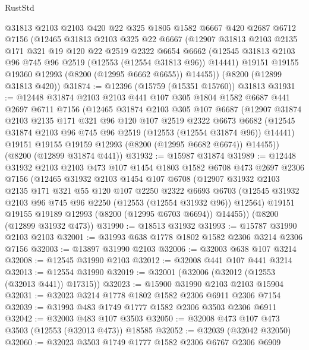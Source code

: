 \begin{lexlean}{RustStd}
\begin{coremodule}
    @31813
    @2103
    @2103
    @420
    @22
    @325
    @1805
    @1582
    @6667
    @420
    @2687
    @6712
    @7156
    (@12465
      @31813
      @2103
      @325
      @22
      @6667
      (@12907
        @31813
        @2103
        @2135
        @171
        @321
        @19
        @120
        @22
        @2519
        @2322
        @6654
        @6662
        (@12545 @31813 @2103 @96 @745 @96 @2519 (@12553 (@12554 @31813 @96)) @14441)
        @19151
        @19155
        @19360
        @12993
        (@8200 (@12995 @6662 @6655))
        @14455))
    (@8200 (@12899 @31813 @420))
@31874 := @12396 (@15759 (@15351 @15760)) @31813
@31931 := @12448
    @31874
    @2103
    @2103
    @441
    @107
    @305
    @1804
    @1582
    @6687
    @441
    @2697
    @6711
    @7156
    (@12465
      @31874
      @2103
      @305
      @107
      @6687
      (@12907
        @31874
        @2103
        @2135
        @171
        @321
        @96
        @120
        @107
        @2519
        @2322
        @6673
        @6682
        (@12545 @31874 @2103 @96 @745 @96 @2519 (@12553 (@12554 @31874 @96)) @14441)
        @19151
        @19155
        @19159
        @12993
        (@8200 (@12995 @6682 @6674))
        @14455))
    (@8200 (@12899 @31874 @441))
@31932 := @15987 @31874
@31989 := @12448
    @31932
    @2103
    @2103
    @473
    @107
    @1454
    @1803
    @1582
    @6708
    @473
    @2697
    @2306
    @7156
    (@12465
      @31932
      @2103
      @1454
      @107
      @6708
      (@12907
        @31932
        @2103
        @2135
        @171
        @321
        @55
        @120
        @107
        @2250
        @2322
        @6693
        @6703
        (@12545 @31932 @2103 @96 @745 @96 @2250 (@12553 (@12554 @31932 @96)) @12564)
        @19151
        @19155
        @19189
        @12993
        (@8200 (@12995 @6703 @6694))
        @14455))
    (@8200 (@12899 @31932 @473))
@31990 := @18513 @31932
@31993 := @15787 @31990 @2103 @2103
@32001 := @31993 @638 @1778 @1802 @1582 @2306 @3214 @2306 @7156
@32003 := @13897 @31990 @2103
@32006 := @32003 @638 @107 @3214
@32008 := @12545 @31990 @2103
@32012 := @32008 @441 @107 @441 @3214
@32013 := @12554 @31990
@32019 := @32001 (@32006 (@32012 (@12553 (@32013 @441)) @17315))
@32023 := @15900 @31990 @2103 @2103 @15904
@32031 := @32023 @3214 @1778 @1802 @1582 @2306 @6911 @2306 @7154
@32039 := @31993 @483 @1749 @1777 @1582 @2306 @3503 @2306 @6911
@32042 := @32003 @483 @107 @3503
@32050 := @32008 @473 @107 @473 @3503 (@12553 (@32013 @473)) @18585
@32052 := @32039 (@32042 @32050)
@32060 := @32023 @3503 @1749 @1777 @1582 @2306 @6767 @2306 @6909

\end{coremodule}
\end{lexlean}
